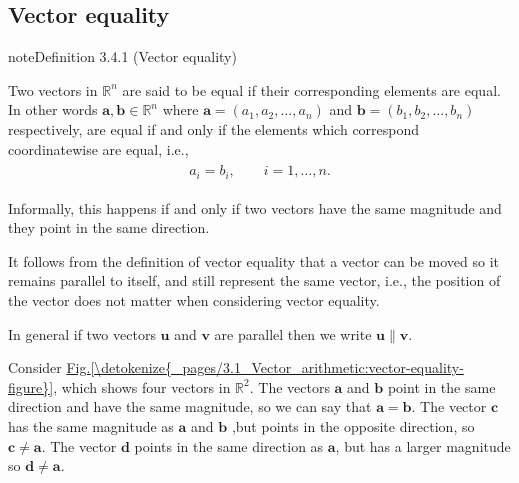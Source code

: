 \documentclass[letterpaper,10pt,english]{jupyterBook}
\begin{document}
\subsection{Vector equality}
\label{\detokenize{_pages/3.1_Vector_arithmetic:vector-equality}}\label{_pages/3.1_Vector_arithmetic:vector-equality-definition}
\begin{sphinxadmonition}{note}{Definition 3.4.1 (Vector equality)}



\sphinxAtStartPar
Two vectors in \(\mathbb{R}^n\) are said to be equal if their corresponding elements are equal. In other words \(\mathbf{a},\mathbf{b}\in \mathbb{R}^n\) where  \(\mathbf{a} = (a_1, a_2, \ldots, a_n)\) and \(\mathbf{b} = (b_1, b_2, \ldots, b_n)\) respectively, are equal if and only if the elements which correspond co\sphinxhyphen{}ordinate\sphinxhyphen{}wise are equal, i.e.,
\begin{equation*}
\begin{split} \begin{align*}
    a_i = b_i, \qquad i = 1, \ldots, n.
\end{align*} \end{split}
\end{equation*}\end{sphinxadmonition}

\sphinxAtStartPar
Informally, this happens if and only if two vectors have the same magnitude and they point in the same direction.

\sphinxAtStartPar
It follows from the definition of vector equality that a vector can be moved so it remains parallel to itself, and still represent the same vector, i.e., the position of the vector does not matter when considering vector equality.

\sphinxAtStartPar
In general if two vectors \(\mathbf{u}\) and \(\mathbf{v}\) are parallel then we write \(\mathbf{u} \parallel \mathbf{v}\).

\sphinxAtStartPar
Consider \hyperref[\detokenize{_pages/3.1_Vector_arithmetic:vector-equality-figure}]{Fig.\@ \ref{\detokenize{_pages/3.1_Vector_arithmetic:vector-equality-figure}}}, which shows four vectors in \(\mathbb{R}^2\). The vectors \(\mathbf{a}\) and \(\mathbf{b}\) point in the same direction and have the same magnitude, so we can say that \(\mathbf{a}=\mathbf{b}\). The vector \(\mathbf{c}\) has the same magnitude as \(\mathbf{a}\) and \(\mathbf{b}\) ,but points in the opposite direction, so \(\mathbf{c}\neq \mathbf{a}\). The vector \(\mathbf{d}\) points in the same direction as \(\mathbf{a}\), but has a larger magnitude \sphinxhyphen{} so \(\mathbf{d} \neq \mathbf{a}\).
\end{document}
